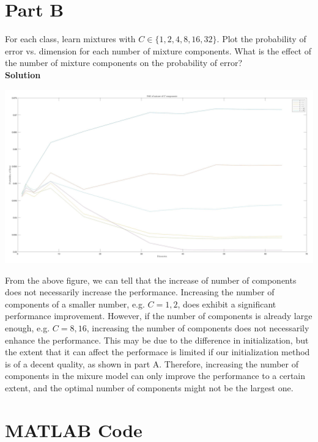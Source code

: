 \documentclass{article}
\begin{document}
\section*{Part B}

For each class, learn mixtures with $C \in \{1, 2, 4, 8, 16, 32\}$. Plot the probability of error vs. dimension for each number of mixture components. What is the effect of the number of mixture components on the probability of error? \\

\textbf{\large Solution}
\\

\begin{center}
    \includegraphics[width=\textwidth]{partB}
\end{center}
From the above figure, we can tell that the increase of number of components does not necessarily increase the performance. Increasing the number of components of a smaller number, e.g. $C = 1, 2$, does exhibit a significant performance improvement. However, if the number of components is already large enough, e.g. $C = 8, 16$, increasing the number of components does not necessarily enhance the performance. This may be due to the difference in initialization, but the extent that it can affect the performace is limited if our initialization method is of a decent quality, as shown in part A. Therefore, increasing the number of components in the mixure model can only improve the performance to a certain extent, and the optimal number of components might not be the largest one.

\pagebreak

\section*{MATLAB Code}
\end{document}
